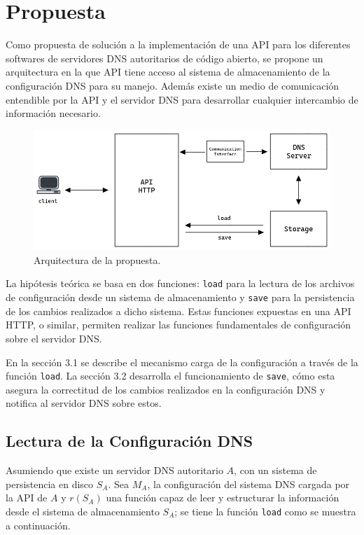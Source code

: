 \chapter{Propuesta}\label{chapter:proposal}

Como propuesta de solución a la implementación de una API para los diferentes softwares de servidores DNS autoritarios de código abierto, se propone un arquitectura en la que API tiene acceso al sistema de almacenamiento de la configuración DNS para su manejo. Además existe un medio de comunicación entendible por la API y el servidor DNS para desarrollar cualquier intercambio de información necesario.

\begin{figure}[!ht]
    \centering
    \includegraphics[width=\linewidth]{draws/proposal.png}
    \caption{Arquitectura de la propuesta.}
\end{figure}

La hipótesis teórica se basa en dos funciones: \verb+load+ para la lectura de los archivos de configuración desde un sistema de almacenamiento y \verb+save+ para la persistencia de los cambios realizados a dicho sistema. Estas funciones expuestas en una API HTTP, o similar, permiten realizar las funciones fundamentales de configuración sobre el servidor DNS.

En la sección 3.1 se describe el mecanismo carga de la configuración a través de la función \verb|load|. La sección 3.2 desarrolla el funcionamiento de \verb|save|, cómo esta asegura la correctitud de los cambios realizados en la configuración DNS y notifica al servidor DNS sobre estos.

\section{Lectura de la Configuración DNS}

Asumiendo que existe un servidor DNS autoritario $A$, con un sistema de persistencia en disco $S_A$. Sea $M_A$, la configuración del sistema DNS cargada por la API de $A$ y $r(S_A)$ una función capaz de leer y estructurar la información desde el sistema de almacenamiento $S_A$; se tiene la función \verb+load+ como se muestra a continuación.

